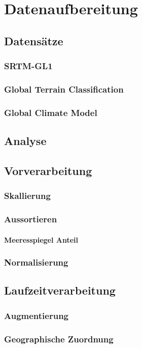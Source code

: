 \chapter{Datenaufbereitung}


\section{Datensätze}

\subsection{SRTM-GL1}

\subsection{Global Terrain Classification}

\subsection{Global Climate Model}


\section{Analyse}


\section{Vorverarbeitung}

\subsection{Skallierung}

\subsection{Aussortieren}

\subsubsection{Meeresspiegel Anteil}

\subsection{Normalisierung}


\section{Laufzeitverarbeitung}

\subsection{Augmentierung}

\subsection{Geographische Zuordnung}

